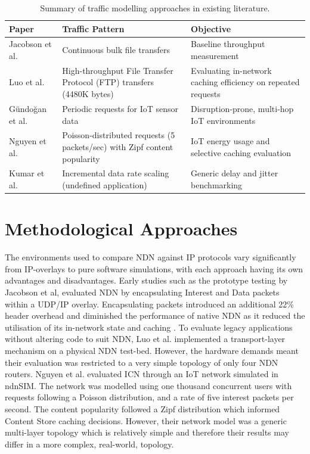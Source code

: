 \documentclass[12pt]{report}
\begin{document}
\begin{table}[h!]
    \centering
    \begin{tabularx}{\textwidth}{@{} l >{\raggedright\arraybackslash}X >{\raggedright\arraybackslash}X @{}}
    \toprule
    \textbf{Paper} & \textbf{Traffic Pattern} & \textbf{Objective} \\ 
    \midrule
    Jacobson et al. \cite{jacobson_networking_2009} & Continuous bulk file transfers & Baseline throughput measurement \\ \addlinespace
    Luo et al. \cite{luo_ipndn_2018} & High-throughput File Transfer Protocol (FTP) transfers (4480K bytes) & Evaluating in-network caching efficiency on repeated requests \\ \addlinespace
    Gündoğan et al. \cite{gundogan_ndn_2018} & Periodic requests for IoT sensor data & Disruption-prone, multi-hop IoT environments \\ \addlinespace
    Nguyen et al. \cite{nguyen_cross-layer_2022} & Poisson-distributed requests (5 packets/sec) with Zipf content popularity & IoT energy usage and selective caching evaluation \\ \addlinespace
    Kumar et al. \cite{kumar_comparing_2022} & Incremental data rate scaling (undefined application) & Generic delay and jitter benchmarking \\ 
    \bottomrule
    \end{tabularx}
    \caption{Summary of traffic modelling approaches in existing literature.}
    \label{tab:traffic_models}
\end{table}
\clearpage


    \section{Methodological Approaches}
    The environments used to compare NDN against IP protocols vary significantly from IP-overlays to pure software simulations, with each approach having its own advantages and disadvantages. Early studies such as the prototype testing by Jacobson et al, evaluated NDN by encapsulating Interest and Data packets within a UDP/IP overlay. Encapsulating packets introduced an additional 22\% header overhead and diminished the performance of native NDN as it reduced the utilisation of its in-network state and caching \cite{jacobson_networking_2009}. To evaluate legacy applications without altering code to suit NDN, Luo et al. implemented a transport-layer mechanism on a physical NDN test-bed. However, the hardware demands meant their evaluation was restricted to a very simple topology of only four NDN routers\cite{luo_ipndn_2018}. Nguyen et al.\cite{nguyen_cross-layer_2022} evaluated ICN through an IoT network simulated in ndnSIM. The network was modelled using one thousand concurrent users with requests following a Poisson distribution, and a rate of five interest packets per second. The content popularity followed a Zipf distribution which informed Content Store caching decisions. However, their network model was a generic multi-layer topology which is relatively simple and therefore their results may differ in a more complex, real-world, topology.
\end{document}
